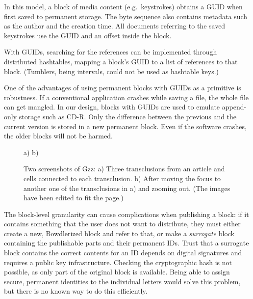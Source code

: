 \documentclass{sig-alternate}
\begin{document}
In this model, a block of media content (e.g.~keystrokes) 
obtains a GUID when first saved to permanent storage. 
The byte sequence also contains metadata such as the author
and the creation time.
All documents referring to
the saved keystrokes use the GUID and
an offset inside the block.

With GUIDs, searching for the references can be implemented through
distributed hashtables\cite{ratnasamy00scalable,stoica01chord}, 
mapping a block's GUID to a list of references
to that block. (Tumblers, being intervals, could not be used
as hashtable keys.)

One of the advantages of using permanent blocks with GUIDs as 
a primitive is robustness. 
If a conventional application crashes while saving a file, the whole
file can get mangled. 
In our design, 
blocks with GUIDs are used to emulate append-only storage such as CD-R.
Only the difference between the
previous and the current version is stored in a new permanent block.
Even if the software crashes, the older blocks will not be harmed.





\begin{figure}
\centering
a)
b)
\caption{
Two screenshots
of Gzz:
a) Three trans\-clusions from an article and cells
connected to each transclusion. b) After moving the focus to another one 
of the transclusions in a) and zooming out.
(The images have been edited to fit the page.)
\label{fig-pdftrans}}
\end{figure}
\break
The block-level granularity can cause complications when
publishing a block:
if it contains something that the user does not want to distribute,
they must either create a
new, Bowdlerized block and refer to that,
or make a \emph{surrogate} block
containing the publishable parts and their permanent IDs.
Trust that a surrogate block contains the correct contents for an ID
depends on digital signatures and requires a public key infrastructure.
Checking the cryptographic hash is not possible, as only part of the
original block is available.
Being able to assign secure, permanent
identities to the individual letters would
solve this problem, but there is no known way to do this efficiently.
\end{document}
